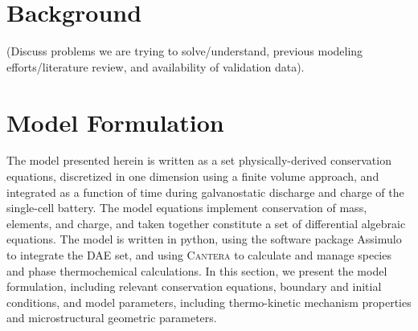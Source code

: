 \documentclass{elsarticle}
\begin{document}
\section{Background}

(Discuss problems we are trying to solve/understand, previous modeling efforts/literature review, and availability of validation data).





\section{Model Formulation}
The model presented herein is written as a set physically-derived conservation equations, discretized in one dimension using a finite volume approach, and integrated as a function of time during galvanostatic discharge and charge of the single-cell battery.  The model equations implement conservation of mass, elements, and charge, and taken together constitute a set of differential algebraic equations.  The model is written in python, using the software package Assimulo \cite{assimulo} to integrate the DAE set, and using \textsc{Cantera} \cite{cantera} to calculate and manage species and phase thermochemical calculations. In this section, we present the model formulation, including relevant conservation equations, boundary and initial conditions, and model parameters, including thermo-kinetic mechanism properties and microstructural geometric parameters.
\end{document}
